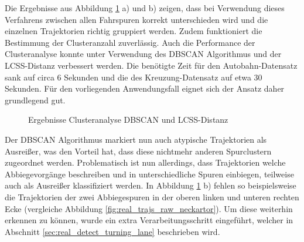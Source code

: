 Die Ergebnisse aus Abbildung \ref{fig:real_results_dbscan_lcss} a) und b) zeigen, dass bei Verwendung
dieses Verfahrens zwischen allen Fahrspuren korrekt unterschieden wird und die einzelnen Trajektorien
richtig gruppiert werden. Zudem funktioniert die Bestimmung der Clusteranzahl zuverlässig.
Auch die Performance der Clusteranalyse konnte unter Verwendung des DBSCAN Algorithmus und der LCSS-Distanz
verbessert werden. Die benötigte Zeit für den Autobahn-Datensatz sank auf circa 6 Sekunden und die des
Kreuzung-Datensatz auf etwa 30 Sekunden. Für den vorliegenden Anwendungsfall eignet sich der Ansatz daher
grundlegend gut.

\begin{figure}[H]
    \centering
    \qquad \qquad
    \caption{Ergebnisse Clusteranalyse DBSCAN und LCSS-Distanz}
    \label{fig:real_results_dbscan_lcss}
\end{figure}

Der DBSCAN Algorithmus markiert nun auch atypische Trajektorien als Ausreißer, was den Vorteil hat, dass
diese nichtmehr anderen Spurclustern zugeordnet werden. Problematisch ist nun allerdings, dass Trajektorien
welche Abbiegevorgänge beschreiben und in unterschiedliche Spuren einbiegen, teilweise auch als Ausreißer
klassifiziert werden. In Abbildung \ref{fig:real_results_dbscan_lcss} b) fehlen so beispielsweise die Trajektorien
der zwei Abbiegespuren in der oberen linken und unteren rechten Ecke (vergleiche Abbildung \ref{fig:real_trajs_raw_neckartor}).
Um diese weiterhin erkennen zu können, wurde ein extra Verarbeitungsschritt eingeführt, welcher in Abschnitt
\ref{sec:real_detect_turning_lane} beschrieben wird.

